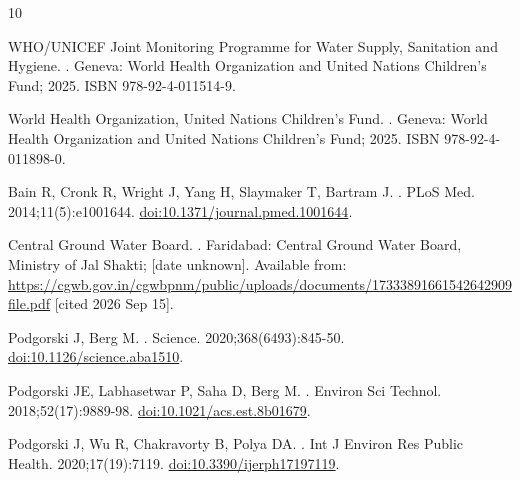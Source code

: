 \documentclass[10pt,letterpaper]{article}
\begin{document}
\begin{thebibliography}{10}

{WHO/UNICEF Joint Monitoring Programme for Water Supply, Sanitation and
  Hygiene}.
.
\newblock Geneva: World Health Organization and United Nations Children's Fund;
  2025.
\newblock ISBN 978-92-4-011514-9.

{World Health Organization}, {United Nations Children's Fund}.
.
\newblock Geneva: World Health Organization and United Nations Children's Fund;
  2025.
\newblock ISBN 978-92-4-011898-0.

{Bain} R, {Cronk} R, {Wright} J, {Yang} H, {Slaymaker} T, {Bartram} J.
.
\newblock PLoS Med. 2014;11(5):e1001644.
\newblock \href {http://dx.doi.org/10.1371/journal.pmed.1001644}
  {doi:10.1371/journal.pmed.1001644}.

{Central Ground Water Board}.
.
\newblock Faridabad: Central Ground Water Board, Ministry of Jal Shakti; [date
  unknown].
\newblock Available from:
  \url{https://cgwb.gov.in/cgwbpnm/public/uploads/documents/17333891661542642909file.pdf}
  [cited 2026 Sep 15].

{Podgorski} J, {Berg} M.
.
\newblock Science. 2020;368(6493):845-50.
\newblock \href {http://dx.doi.org/10.1126/science.aba1510}
  {doi:10.1126/science.aba1510}.

{Podgorski} JE, {Labhasetwar} P, {Saha} D, {Berg} M.
.
\newblock Environ Sci Technol. 2018;52(17):9889-98.
\newblock \href {http://dx.doi.org/10.1021/acs.est.8b01679}
  {doi:10.1021/acs.est.8b01679}.

{Podgorski} J, {Wu} R, {Chakravorty} B, {Polya} DA.
.
\newblock Int J Environ Res Public Health. 2020;17(19):7119.
\newblock \href {http://dx.doi.org/10.3390/ijerph17197119}
  {doi:10.3390/ijerph17197119}.


\end{thebibliography}
\end{document}
